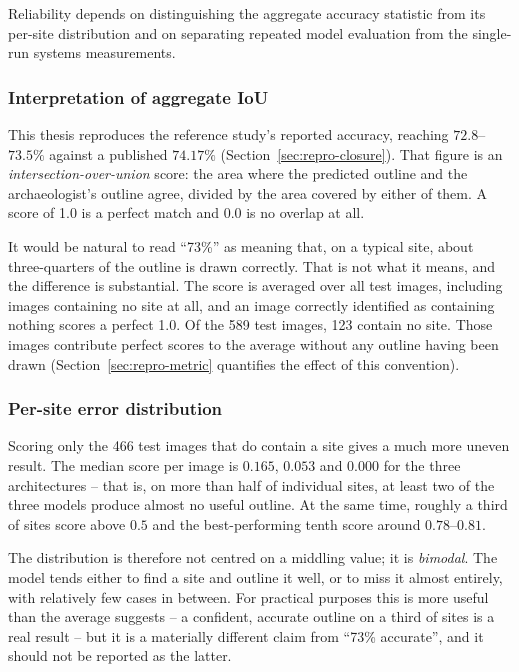 Reliability depends on distinguishing the aggregate accuracy statistic from its
per-site distribution and on separating repeated model evaluation from the
single-run systems measurements.

\subsubsection{Interpretation of aggregate IoU}
This thesis reproduces the reference study's reported accuracy, reaching
$72.8$--$73.5\%$ against a published $74.17\%$
(Section~\ref{sec:repro-closure}). That figure is an
\emph{intersection-over-union} score: the area where the predicted outline and
the archaeologist's outline agree, divided by the area covered by either of
them. A score of 1.0 is a perfect match and 0.0 is no overlap at all.

It would be natural to read ``73\%'' as meaning that, on a typical site, about
three-quarters of the outline is drawn correctly. That is not what it means,
and the difference is substantial. The score is averaged over all test images,
including images containing no site at all, and an image correctly identified
as containing nothing scores a perfect 1.0. Of the 589 test images, 123 contain
no site. Those images contribute perfect scores to the average without any
outline having been drawn (Section~\ref{sec:repro-metric} quantifies the effect
of this convention).

\subsubsection{Per-site error distribution}
Scoring only the 466 test images that do contain a site gives a much more
uneven result. The median score per image is $0.165$, $0.053$ and $0.000$ for
the three architectures -- that is, on more than half of individual sites, at
least two of the three models produce almost no useful outline. At the same
time, roughly a third of sites score above $0.5$ and the best-performing tenth
score around $0.78$--$0.81$.

The distribution is therefore not centred on a middling value; it is
\emph{bimodal}. The model tends either to find a site and outline it well, or
to miss it almost entirely, with relatively few cases in between. For practical
purposes this is more useful than the average suggests -- a confident, accurate
outline on a third of sites is a real result -- but it is a materially
different claim from ``73\% accurate'', and it should not be reported as the
latter.

